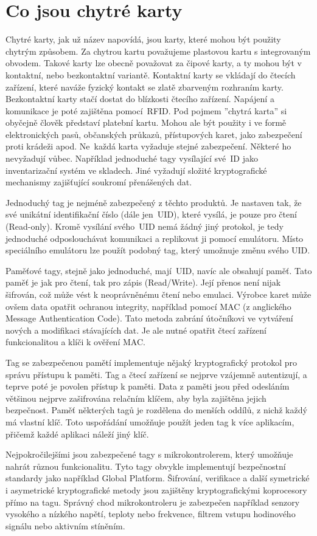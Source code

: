 \section{Co jsou chytré karty}
Chytré karty, jak už název napovídá, jsou karty, které mohou být použity chytrým způsobem. Za chytrou kartu považujeme plastovou kartu s integrovaným obvodem. Takové karty lze obecně považovat za čipové karty, a ty mohou být v kontaktní, nebo bezkontaktní variantě. Kontaktní karty se vkládají do čtecích zařízení, které naváže fyzický kontakt se zlatě zbarveným rozhraním karty. Bezkontaktní karty stačí dostat do blízkosti čtecího zařízení. Napájení a komunikace je poté zajištěna pomocí~RFID. Pod pojmem ''chytrá karta'' si obyčejně člověk představí platební kartu. Mohou ale být použity i ve formě elektronických pasů, občanských průkazů, přístupových karet, jako zabezpečení proti krádeži apod. Ne~každá karta vyžaduje stejné zabezpečení. Některé ho nevyžadují vůbec. Například jednoduché tagy vysílající své~ID jako inventarizační systém ve skladech. Jiné vyžadují složité  kryptografické mechanismy zajišťující soukromí přenášených dat. 
\par
Jednoduchý tag je nejméně zabezpečený z těchto produktů. Je nastaven tak, že své unikátní identifikační číslo (dále jen~UID), které vysílá, je pouze pro čtení {(Read-only)}. Kromě vysílání svého~UID nemá žádný jiný protokol, je tedy jednoduché odposlouchávat komunikaci a replikovat ji pomocí emulátoru. Místo speciálního emulátoru lze použít podobný tag, který umožnuje změnu svého UID.
\par
Paměťové tagy, stejně jako jednoduché, mají~UID, navíc ale obsahují paměť. Tato paměť je jak pro čtení, tak pro zápis {(Read/Write)}. Její přenos není nijak šifrován, což může vést k neoprávněnému čtení nebo emulaci. Výrobce karet může ovšem data opatřit ochranou integrity, například pomocí MAC (z anglického Message Authentication Code). Tato metoda zabrání útočníkovi ve vytváření nových a modifikaci stávajících dat. Je ale nutné opatřit čtecí zařízení funkcionalitou a klíči k ověření MAC\cite{Mifare_Classic_story}.
\par
Tag se zabezpečenou pamětí implementuje nějaký kryptografický protokol pro správu přístupu k paměti. Tag a čtecí zařízení se nejprve vzájemně autentizují, a teprve poté je povolen přístup k paměti. Data z paměti jsou před odesláním většinou nejprve zašifrována relačním klíčem, aby byla zajištěna jejich bezpečnost. Paměť některých tagů je rozdělena do menších oddílů, z nichž každý má vlastní klíč. Toto uspořádání umožňuje použít jeden tag k více aplikacím, přičemž každé aplikaci náleží jiný klíč.
\par
Nejpokročilejšími jsou zabezpečené tagy s mikrokontrolerem, který umožňuje nahrát různou funkcionalitu. Tyto tagy obvykle implementují bezpečnostní standardy jako například Global Platform. Šifrování, verifikace a další symetrické i asymetrické kryptografické metody jsou zajištěny kryptografickými koprocesory přímo na tagu\cite{Mifare_Classic_story}. Správný chod mikrokontroleru je zabezpečen například senzory vysokého a nízkého napětí, teploty nebo frekvence, filtrem vstupu hodinového signálu nebo aktivním stíněním\cite{NXP_Microcontroller_overview}.


